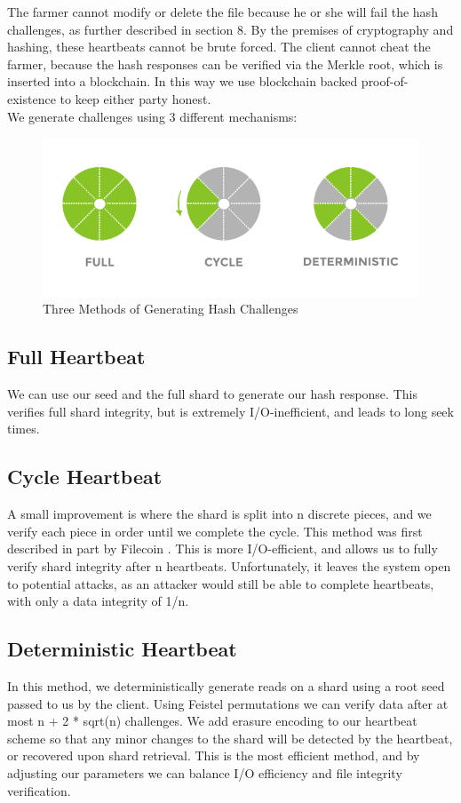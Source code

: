 \documentclass[a4paper,10pt]{article}
\begin{document}
The farmer cannot modify or delete the file because he or she will fail the hash challenges, as further described in section 8. By the premises of cryptography and hashing, these heartbeats cannot be brute forced. The client cannot cheat the farmer, because the hash responses can be verified via the Merkle root, which is inserted into a blockchain. In this way we use blockchain backed proof-of-existence \cite{4} \cite{5} to keep either party honest.\\

We generate challenges using 3 different mechanisms: \\

\begin{figure}[h!]
\centering
\includegraphics[width=\linewidth]{4}
\caption{Three Methods of Generating Hash Challenges}
\end{figure}

\subsection{Full Heartbeat}
We can use our seed and the full shard to generate our hash response. This verifies full shard integrity, but is extremely I/O-inefficient, and leads to long seek times.
\subsection{Cycle Heartbeat}
A small improvement is where the shard is split into n discrete pieces, and we verify each piece in order until we complete the cycle. This method was first described in part by Filecoin \cite{11}. This is more I/O-efficient, and allows us to fully verify shard integrity after n heartbeats. Unfortunately, it leaves the system open to potential attacks, as an attacker would still be able to complete heartbeats, with only a data integrity of 1/n.
\subsection{Deterministic Heartbeat}
In this method, we deterministically generate reads on a shard using a root seed passed to us by the client. Using Feistel permutations we can verify data after at most n + 2 * sqrt(n) challenges. We add erasure encoding to our heartbeat scheme so that any minor changes to the shard will be detected by the heartbeat, or recovered upon shard retrieval. This is the most efficient method, and by adjusting our parameters we can balance I/O efficiency and file integrity verification.   
\end{document}
